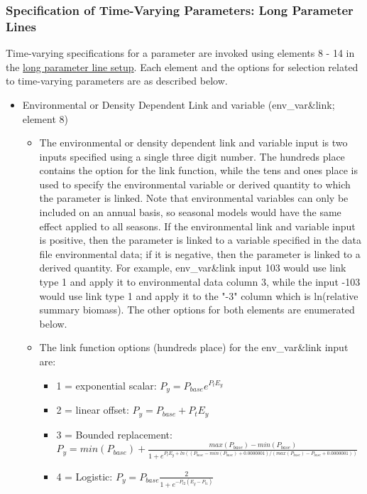 \subsubsection{Specification of Time-Varying Parameters: Long Parameter Lines} 

Time-varying specifications for a parameter are invoked using elements 8 - 14 in the \hyperlink{paraOrder}{long parameter line setup}. Each element and the options for selection related to time-varying parameters are as described below.

\hypertarget{EnvVar}{}
\begin{itemize}

\item Environmental or Density Dependent Link and variable (env\_var\&link; element 8)

	\begin{itemize}
	   \item The environmental or density dependent link and variable input is two inputs specified using a single three digit number. The hundreds place contains the option for the link function, while the tens and ones place is used to specify the environmental variable or derived quantity to which the parameter is linked. Note that environmental variables can only be included on an annual basis, so seasonal models would have the same effect applied to all seasons. If the environmental link and variable input is positive, then the parameter is linked to a variable specified in the data file environmental data; if it is negative, then the parameter is linked to a derived quantity. For example, env\_var\&link input 103 would use link type 1 and apply it to environmental data column 3, while the input -103  would use link type 1 and apply it to the "-3" column which is ln(relative summary biomass). The other options for both elements are enumerated below.
	   \item The link function options (hundreds place) for the env\_var\&link input are:
	   \begin{itemize}
	       \item 1 = exponential scalar: $P_{y} = P_{base}e^{P_{t}E_{y}}$
		   \item 2 = linear offset: $P_{y} = P_{base} + P_{t}E_{y}$
		   \item 3 = Bounded replacement: $P_{y} = min(P_{base})+\frac{max(P_{base})-min(P_{base})}{1+e^{P_tE_y+ln((P_{base}-min(P_{base})+0.0000001)/(max(P_{base})-P_{base}+0.0000001))}}$
		   \item 4 = Logistic: $P_{y} = P_{base}\frac{2}{1+e^{-P_{t2}(E_{y}-P_{t1})}}$

\end{itemize}
\end{itemize}
\end{itemize}
